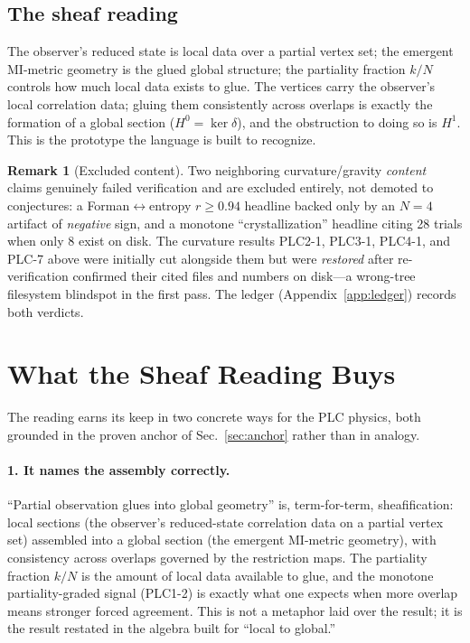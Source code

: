 \documentclass[aps,pra,twocolumn,superscriptaddress,floatfix]{revtex4-2}
\theoremstyle{definition}
\newtheorem{remark}{Remark}
\begin{document}
\subsection{The sheaf reading}

The observer's reduced state is local data over a partial vertex set; the
emergent MI-metric geometry is the glued global structure; the partiality
fraction $k/N$ controls how much local data exists to glue. The vertices carry
the observer's local correlation data; gluing them consistently across overlaps
is exactly the formation of a global section ($H^0=\ker\delta$), and the
obstruction to doing so is $H^1$. This is the prototype the language is built to
recognize.

\begin{remark}[Excluded content]
Two neighboring curvature/gravity \emph{content} claims genuinely failed
verification and are excluded entirely, not demoted to conjectures: a
Forman$\leftrightarrow$entropy $r\geq0.94$ headline backed only by an $N=4$
artifact of \emph{negative} sign, and a monotone ``crystallization'' headline
citing 28 trials when only 8 exist on disk. The curvature results PLC2-1,
PLC3-1, PLC4-1, and PLC-7 above were initially cut alongside them but were
\emph{restored} after re-verification confirmed their cited files and numbers on
disk---a wrong-tree filesystem blindspot in the first pass. The ledger
(Appendix~\ref{app:ledger}) records both verdicts.
\end{remark}

\section{What the Sheaf Reading Buys}
\label{sec:buys}

The reading earns its keep in two concrete ways for the PLC physics, both
grounded in the proven anchor of Sec.~\ref{sec:anchor} rather than in analogy.

\paragraph{1. It names the assembly correctly.}
``Partial observation glues into global geometry'' is, term-for-term,
sheafification: local sections (the observer's reduced-state correlation data on
a partial vertex set) assembled into a global section (the emergent MI-metric
geometry), with consistency across overlaps governed by the restriction maps.
The partiality fraction $k/N$ is the amount of local data available to glue, and
the monotone partiality-graded signal (PLC1-2) is exactly what one expects when
more overlap means stronger forced agreement. This is not a metaphor laid over
the result; it is the result restated in the algebra built for ``local to
global.''
\end{document}
